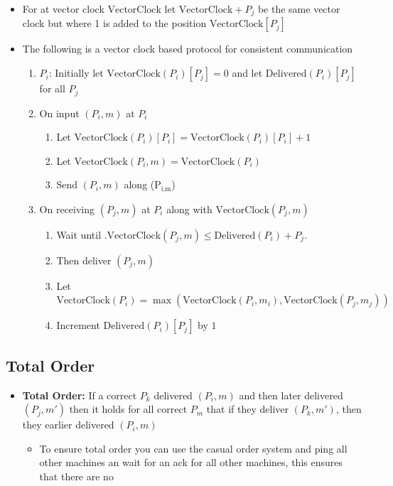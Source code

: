 \documentclass[11pt]{article}
\begin{document}
\begin{itemize}
\item For at vector clock \(\text{VectorClock}\) let \(\text{VectorClock}+P_j\) be the same vector clock but where 1 is added to the position \(\text{VectorClock}[P_j]\)

\item The following is a vector clock based protocol for consistent communication
\begin{enumerate}
\item \(P_i\): Initially let \(\text{VectorClock}(P_i)[P_j] = 0\) and let \(\text{Delivered}(P_i)[P_j]\)  for all \(P_j\)
\item On input \((P_i,m)\) at \(P_i\)
\begin{enumerate}
\item Let \(\text{VectorClock}(P_i)[P_i] = \text{VectorClock}(P_i)[P_i] +1\)
\item Let \(\text{VectorClock}(P_i,m)=\text{VectorClock}(P_i)\)
\item Send \((P_i,m)\) along (P\(_{\text{i,m}}\))
\end{enumerate}
\item On receiving \((P_j,m)\) at \(P_i\) along with \(\text{VectorClock}(P_j,m)\)
\begin{enumerate}
\item Wait until .\(\text{VectorClock}(P_j,m) \leq \text{Delivered} (P_i) + P_j\).
\item Then deliver \((P_j,m)\)
\item Let \(\text{VectorClock}(P_i) = \max(\text{VectorClock}(P_i,m_i), \text{VectorClock}(P_j,m_j))\)
\item Increment \(\text{Delivered}(P_i)[P_j]\) by \(1\)
\end{enumerate}
\end{enumerate}
\end{itemize}

\subsection{Total Order}
\label{sec:orga931433}
\begin{itemize}
\item \textbf{Total Order:} If a correct \(P_k\) delivered \((P_i,m)\) and then later delivered \((P_j,m')\) then it holds for all correct \(P_m\) that if they deliver \((P_k,m')\), then they earlier delivered \((P_i,m)\)
\begin{itemize}
\item To ensure total order you can use the casual order system and ping all other machines an wait for an ack for all other machines, this ensures that there are no
\end{itemize}
\end{itemize}
\end{document}
